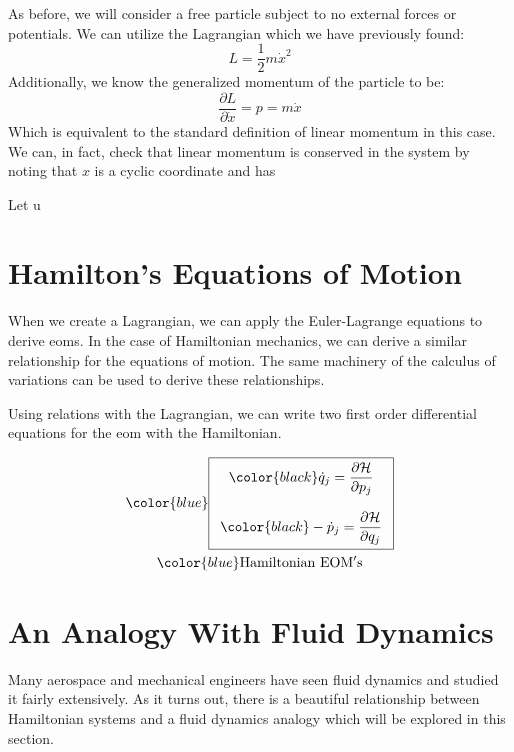 \begin{example}
    As before, we will consider a free particle subject to no external forces or potentials. We can utilize the \gls{Lagrangian} which we have previously found:
    $$L=\frac{1}{2}m\dot{x}^2$$
    Additionally, we know the generalized momentum of the particle to be:
    $$\frac{\partial L}{\partial \dot{x}}=p=m\dot{x}$$
    Which is equivalent to the standard definition of linear momentum in this case. We can, in fact, check that linear momentum is conserved in the system by noting that $x$ is a cyclic coordinate and has 
\end{example}

Let u

\section{Hamilton's Equations of Motion}
When we create a \gls{Lagrangian}, we can apply the Euler-Lagrange equations to derive \glspl{eom}. In the case of \gls{Hamiltonian} mechanics, we can derive a similar relationship for the equations of motion. The same machinery of the calculus of variations can be used to derive these relationships.

Using relations with the \gls{Lagrangian}, we can write two first order differential equations for the \gls{eom} with the \gls{Hamiltonian}.

\begin{gather}
\color{blue}\boxed{
\begin{array}{c}\color{black}
     \dot{q}_j=\dfrac{\partial \mathcal{H}}{\partial p_j}\\\\
     \color{black}
  -\dot{p}_j=\dfrac{\partial \mathcal{H}}{\partial q_j}
\end{array}
}\\
\color{blue}\mathrm{Hamiltonian \ EOM's}
\end{gather}



\section{An Analogy With Fluid Dynamics}
Many aerospace and mechanical engineers have seen fluid dynamics and studied it fairly extensively. As it turns out, there is a beautiful relationship between \gls{Hamiltonian} systems and a fluid dynamics analogy which will be explored in this section.



